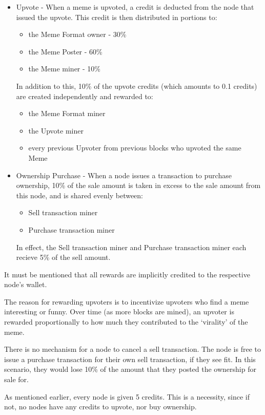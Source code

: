 \documentclass[12pt]{article}
\begin{document}
\begin{itemize}
\item Upvote - When a meme is upvoted, a credit is deducted from the
  node that issued the upvote. This credit is then distributed in
  portions to:
  \begin{itemize}
  \item the Meme Format owner - 30\%
  \item the Meme Poster - 60\%
  \item the Meme miner - 10\%
  \end{itemize}
  In addition to this, 10\% of the upvote credits (which amounts to
  0.1 credits) are created independently and rewarded to:
  \begin{itemize}
  \item the Meme Format miner
  \item the Upvote miner
  \item every previous Upvoter from previous blocks who upvoted the
    same Meme
  \end{itemize}
\item Ownership Purchase - When a node issues a transaction to
  purchase ownership, 10\% of the sale amount is taken in excess to
  the sale amount from this node, and is shared evenly between:
  \begin{itemize}
  \item Sell transaction miner
  \item Purchase transaction miner
  \end{itemize}
  In effect, the Sell transaction miner and Purchase transaction miner
  each recieve 5\% of the sell amount.
\end{itemize}

It must be mentioned that all rewards are implicitly credited to the
respective node's wallet.

The reason for rewarding upvoters is to incentivize upvoters who find
a meme interesting or funny. Over time (as more blocks are mined), an
upvoter is rewarded proportionally to how much they contributed to the
`virality' of the meme.

There is no mechanism for a node to cancel a sell transaction. The
node is free to issue a purchase transaction for their own sell
transaction, if they see fit. In this scenario, they would lose 10\%
of the amount that they posted the ownership for sale for.

As mentioned earlier, every node is given 5 credits. This is a
necessity, since if not, no nodes have any credits to upvote, nor buy
ownership.
\end{document}
